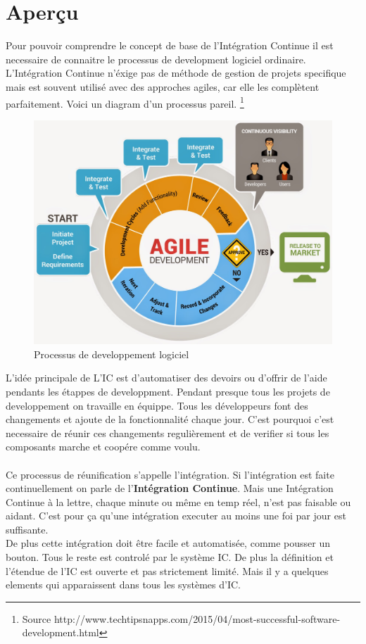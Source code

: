 \section{Aperçu}
Pour pouvoir comprendre le concept de base de l'Intégration Continue il est necessaire de connaitre le processus de development logiciel ordinaire. L'Intégration Continue n'éxige pas de méthode de gestion de projets specifique mais est souvent utilisé avec des approches agiles, car elle les complètent parfaitement. Voici un diagram d'un processus pareil. \footnote{Source http://www.techtipsnapps.com/2015/04/most-successful-software-development.html}
\begin{figure}[H]
	\centering
		\includegraphics[scale=0.25]{bilder/agile_methodology}
	\caption{Processus de developpement logiciel}
	\label{fig:processus}
\end{figure}

L'idée principale de L'IC est d'automatiser des devoirs ou d'offrir de l'aide pendants les étappes de developpment. Pendant presque tous les projets de developpement on travaille en équippe. Tous les développeurs font des changements et ajoute de la fonctionnalité chaque jour. C'est pourquoi c'est necessaire de réunir ces changements regulièrement et de verifier si tous les composants marche et coopére comme voulu.\\\\
Ce processus de réunification s'appelle l'intégration. Si l'intégration est faite continuellement on parle de l'\textbf{Intégration Continue}. Mais une Intégration Continue à la lettre, chaque minute ou même en temp réel, n'est pas faisable ou aidant. C'est pour ça qu'une intégration executer au moins une foi par jour est suffisante.\\
De plus cette intégration doit être facile et automatisée, comme pousser un bouton. Tous le reste est controlé par le système IC. De plus la définition et l'étendue de l'IC est ouverte et pas strictement limité. Mais il y a quelques elements qui apparaissent dans tous les systèmes d'IC.
\newpage


